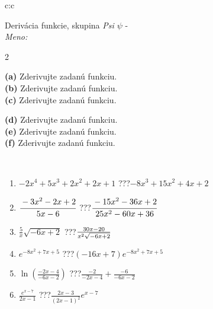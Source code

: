 \documentclass[10pt]{report}
\begin{document}
\newpage
\thispagestyle{empty}
\begin{tabular}{c:c}
\begin{minipage}[c][104.5mm][t]{0.5\linewidth}
\begin{center}
\vspace{7mm}
{\huge Derivácia funkcie, skupina \textit{Psi $\psi$} -}\\[5mm]
\textit{Meno:}\phantom{xxxxxxxxxxxxxxxxxxxxxxxxxxxxxxxxxxxxxxxxxxxxxxxxxxxxxxxxxxxxxxxxx}\\[5mm]
\begin{minipage}{0.95\linewidth}
\begin{center}
{\small \begin{multicols}{2} \raggedright
\textbf{(a)} Zderivujte zadanú funkciu. \\[1mm]
\textbf{(b)} Zderivujte zadanú funkciu. \\[1mm]
\textbf{(c)} Zderivujte zadanú funkciu. \par \columnbreak
\textbf{(d)} Zderivujte zadanú funkciu. \\[1mm]
\textbf{(e)} Zderivujte zadanú funkciu. \\[1mm]
\textbf{(f)} Zderivujte zadanú funkciu.
\end{multicols}
}
\end{center}
\end{minipage}
\\[4mm]
\begin{minipage}{0.79\linewidth}
\begin{center}
\begin{varwidth}{\linewidth}
\begin{enumerate}
\normalsize
\item $-2x^4+5x^3+2x^2+2x+1$\quad \dotfill\; ???\;\dotfill \quad $-8x^3+15x^2+4x+2$
\item $\cfrac{-3x^2-2x+2}{5x-6}$\quad \dotfill\; ???\;\dotfill \quad $\cfrac{-15x^2-36x+2}{25x^2-60x+36}$
\item $\frac{5}{x}\sqrt{-6x+2}$\quad \dotfill\; ???\;\dotfill \quad $\frac{30x-20}{x^2 \sqrt{\smash[b]{-6x+2}}}$
\item $e^{-8x^2+7x+5}$\quad \dotfill\; ???\;\dotfill \quad $(-16x+7)e^{-8x^2+7x+5}$
\item $\ln{\left(\frac{-2x-4}{-6x-2}\right)}$\quad \dotfill\; ???\;\dotfill \quad $\frac{-2}{-2x-4}+\frac{-6}{-6x-2}$
\item $\frac{e^{x-7}}{2x-1}$\quad \dotfill\; ???\;\dotfill \quad $\frac{2x-3}{(2x-1)^2}e^{x-7}$
\end{enumerate}

\end{varwidth}
\end{center}
\end{minipage}
\end{center}
\end{minipage}
\end{tabular}
\end{document}
